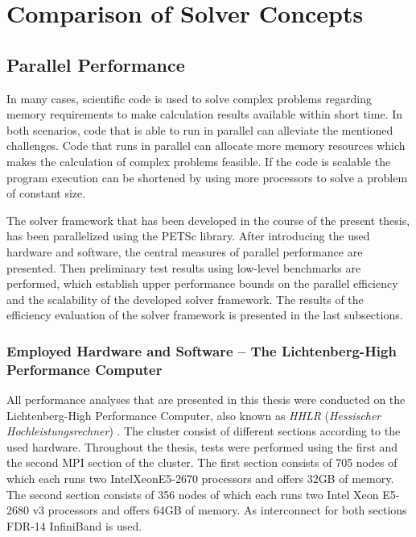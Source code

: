 \section{Comparison of Solver Concepts}
  
\subsection{Parallel Performance}

In many cases, scientific code is used to solve complex problems regarding memory requirements to make calculation results available within short time. In both scenarios, code that is able to run in parallel can alleviate the mentioned challenges. Code that runs in parallel can allocate more memory resources which makes the calculation of complex problems feasible. If the code is scalable the program execution can be shortened by using more processors to solve a problem of constant size.

The solver framework that has been developed in the course of the present thesis, has been parallelized using the PETSc library. After introducing the used hardware and software, the central measures of parallel performance are presented. Then preliminary test results using low-level benchmarks are performed, which establish upper performance bounds on the parallel efficiency and the scalability of the developed solver framework. The results of the efficiency evaluation of the solver framework is presented in the last subsections.
\subsubsection{Employed Hardware and Software -- The Lichtenberg-High Performance Computer }

All performance analyses that are presented in this thesis were conducted on the Lichtenberg-High Performance Computer, also known as \emph{HHLR} (\emph{Hessischer Hochleistungsrechner}) \cite{hhlr}. The cluster consist of different sections according to the used hardware. Throughout the thesis, tests were performed using the first and the second MPI section of the cluster. The first section consists of 705 nodes of which each runs two Intel\textregistered Xeon\textregistered E5-2670 processors and offers 32GB of memory. The second section consists of 356 nodes of which each runs two Intel Xeon E5-2680 v3 processors and offers 64GB of memory. As interconnect for both sections FDR-14 InfiniBand is used.

